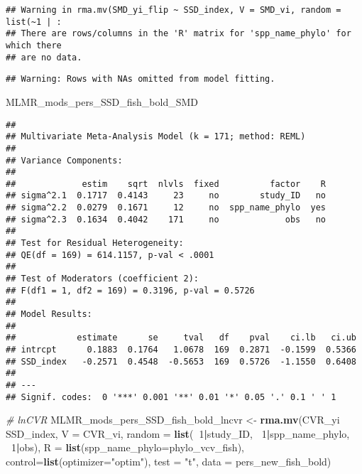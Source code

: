 \documentclass[]{article}
\newenvironment{Shaded}{\begin{snugshade}}{\end{snugshade}}
\newcommand{\KeywordTok}[1]{\textcolor[rgb]{0.13,0.29,0.53}{\textbf{#1}}}
\newcommand{\DataTypeTok}[1]{\textcolor[rgb]{0.13,0.29,0.53}{#1}}
\newcommand{\DecValTok}[1]{\textcolor[rgb]{0.00,0.00,0.81}{#1}}
\newcommand{\StringTok}[1]{\textcolor[rgb]{0.31,0.60,0.02}{#1}}
\newcommand{\CommentTok}[1]{\textcolor[rgb]{0.56,0.35,0.01}{\textit{#1}}}
\newcommand{\OperatorTok}[1]{\textcolor[rgb]{0.81,0.36,0.00}{\textbf{#1}}}
\newcommand{\NormalTok}[1]{#1}
\begin{document}
\begin{verbatim}
## Warning in rma.mv(SMD_yi_flip ~ SSD_index, V = SMD_vi, random = list(~1 | :
## There are rows/columns in the 'R' matrix for 'spp_name_phylo' for which there
## are no data.
\end{verbatim}

\begin{verbatim}
## Warning: Rows with NAs omitted from model fitting.
\end{verbatim}

\begin{Shaded}
\begin{Highlighting}[]
\NormalTok{    MLMR_mods_pers_SSD_fish_bold_SMD}
\end{Highlighting}
\end{Shaded}

\begin{verbatim}
## 
## Multivariate Meta-Analysis Model (k = 171; method: REML)
## 
## Variance Components:
## 
##             estim    sqrt  nlvls  fixed          factor    R 
## sigma^2.1  0.1717  0.4143     23     no        study_ID   no 
## sigma^2.2  0.0279  0.1671     12     no  spp_name_phylo  yes 
## sigma^2.3  0.1634  0.4042    171     no             obs   no 
## 
## Test for Residual Heterogeneity:
## QE(df = 169) = 614.1157, p-val < .0001
## 
## Test of Moderators (coefficient 2):
## F(df1 = 1, df2 = 169) = 0.3196, p-val = 0.5726
## 
## Model Results:
## 
##            estimate      se     tval   df    pval    ci.lb   ci.ub 
## intrcpt      0.1883  0.1764   1.0678  169  0.2871  -0.1599  0.5366    
## SSD_index   -0.2571  0.4548  -0.5653  169  0.5726  -1.1550  0.6408    
## 
## ---
## Signif. codes:  0 '***' 0.001 '**' 0.01 '*' 0.05 '.' 0.1 ' ' 1
\end{verbatim}

\begin{Shaded}
\begin{Highlighting}[]
    \CommentTok{# lnCVR}
\NormalTok{      MLMR_mods_pers_SSD_fish_bold_lncvr <-}\StringTok{ }\KeywordTok{rma.mv}\NormalTok{(CVR_yi }\OperatorTok{~}\StringTok{ }\NormalTok{SSD_index, }\DataTypeTok{V =}\NormalTok{ CVR_vi, }
                                            \DataTypeTok{random =} \KeywordTok{list}\NormalTok{(}\OperatorTok{~}\DecValTok{1}\OperatorTok{|}\NormalTok{study_ID, }\OperatorTok{~}\DecValTok{1}\OperatorTok{|}\NormalTok{spp_name_phylo, }\OperatorTok{~}\DecValTok{1}\OperatorTok{|}\NormalTok{obs), }
                                            \DataTypeTok{R =} \KeywordTok{list}\NormalTok{(}\DataTypeTok{spp_name_phylo=}\NormalTok{phylo_vcv_fish), }\DataTypeTok{control=}\KeywordTok{list}\NormalTok{(}\DataTypeTok{optimizer=}\StringTok{"optim"}\NormalTok{), }
                                            \DataTypeTok{test =} \StringTok{"t"}\NormalTok{, }\DataTypeTok{data =}\NormalTok{ pers_new_fish_bold)  }
\end{Highlighting}
\end{Shaded}
\end{document}
